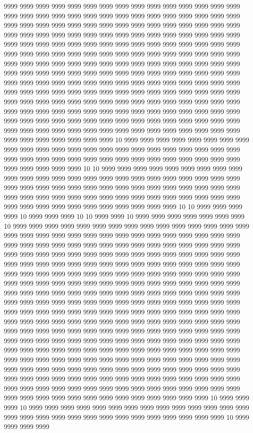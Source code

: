 9999 9999 9999 9999 9999 9999 9999 9999 9999 9999 9999 9999 9999 9999 9999 9999 9999 9999 9999 9999 9999 9999 9999 9999 9999 9999 9999 9999 9999 9999 9999 9999 9999 9999 9999 9999 9999 9999 9999 9999 9999 9999 9999 9999 9999 9999 9999 9999 9999 9999 9999 9999 9999 9999 9999 9999 9999 9999 9999 9999 9999 9999 9999 9999 9999 9999 9999 9999 9999 9999 9999 9999 9999 9999 9999 9999 9999 9999 9999 9999 9999 9999 9999 9999 9999 9999 9999 9999 9999 9999 9999 9999 9999 9999 9999 9999 9999 9999 9999 9999 9999 9999 9999 9999 9999 9999 9999 9999 9999 9999 9999 9999 9999 9999 9999 9999 9999 9999 9999 9999 9999 9999 9999 9999 9999 9999 9999 9999 9999 9999 9999 9999 9999 9999 9999 9999 9999 9999 9999 9999 9999 9999 9999 9999 9999 9999 9999 9999 9999 9999 9999 9999 9999 9999 9999 9999 9999 9999 9999 9999 9999 9999 9999 9999 9999 9999 9999 9999 9999 9999 9999 9999 9999 9999 9999 9999 9999 9999 9999 9999 9999 9999 9999 9999 9999 9999 9999 9999 9999 9999 9999 9999 9999 9999 9999 9999 9999 9999 9999 9999 9999 9999 9999 9999 9999 9999 9999 9999 9999 9999 9999 9999 9999 9999 9999 9999 9999 10 9999 9999 9999 9999 9999 9999 9999 9999 9999 9999 9999 9999 9999 9999 9999 9999 9999 9999 9999 9999 9999 9999 9999 9999 9999 9999 9999 9999 9999 9999 9999 9999 9999 9999 9999 9999 9999 9999 9999 9999 9999 9999 9999 10 10 9999 9999 9999 9999 9999 9999 9999 9999 9999 9999 9999 9999 9999 9999 9999 9999 9999 9999 9999 9999 9999 9999 9999 9999 9999 9999 9999 9999 9999 9999 9999 9999 9999 9999 9999 9999 9999 9999 9999 9999 9999 9999 9999 9999 9999 9999 9999 9999 9999 9999 9999 9999 9999 9999 9999 9999 9999 9999 9999 9999 9999 9999 9999 9999 9999 10 10 9999 9999 9999 9999 10 9999 9999 9999 10 10 9999 9999 10 9999 9999 9999 9999 9999 9999 9999 10 9999 9999 9999 9999 9999 9999 9999 9999 9999 9999 9999 9999 9999 9999 9999 9999 9999 9999 9999 9999 9999 9999 9999 9999 9999 9999 9999 9999 9999 9999 9999 9999 9999 9999 9999 9999 9999 9999 9999 9999 9999 9999 9999 9999 9999 9999 9999 9999 9999 9999 9999 9999 9999 9999 9999 9999 9999 9999 9999 9999 9999 9999 9999 9999 9999 9999 9999 9999 9999 9999 9999 9999 9999 9999 9999 9999 9999 9999 9999 9999 9999 9999 9999 9999 9999 9999 9999 9999 9999 9999 9999 9999 9999 9999 9999 9999 9999 9999 9999 9999 9999 9999 9999 9999 9999 9999 9999 9999 9999 9999 9999 9999 9999 9999 9999 9999 9999 9999 9999 9999 9999 9999 9999 9999 9999 9999 9999 9999 9999 9999 9999 9999 9999 9999 9999 9999 9999 9999 9999 9999 9999 9999 9999 9999 9999 9999 9999 9999 9999 9999 9999 9999 9999 9999 9999 9999 9999 9999 9999 9999 9999 9999 9999 9999 9999 9999 9999 9999 9999 9999 9999 9999 9999 9999 9999 9999 9999 9999 9999 9999 9999 9999 9999 9999 9999 9999 9999 9999 9999 9999 9999 9999 9999 9999 9999 9999 9999 9999 9999 9999 9999 9999 9999 9999 9999 9999 9999 9999 9999 9999 9999 9999 9999 9999 9999 9999 9999 9999 9999 9999 9999 9999 9999 9999 9999 9999 9999 9999 9999 9999 9999 9999 9999 9999 9999 9999 9999 9999 9999 9999 9999 9999 9999 9999 9999 9999 9999 9999 9999 9999 9999 9999 9999 9999 9999 9999 9999 9999 9999 9999 9999 9999 9999 9999 9999 9999 9999 9999 9999 9999 9999 9999 9999 9999 9999 9999 9999 9999 9999 9999 9999 9999 9999 10 9999 9999 9999 10 9999 9999 9999 9999 9999 9999 9999 9999 9999 9999 9999 9999 9999 9999 9999 9999 9999 9999 9999 9999 9999 9999 9999 9999 9999 9999 9999 9999 10 9999 9999 9999 9999 